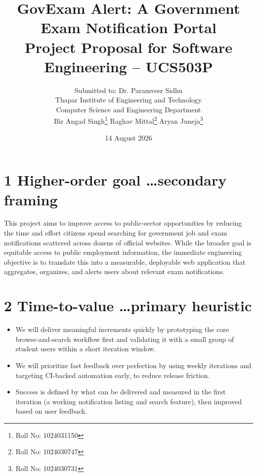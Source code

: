 \documentclass[11pt,a4paper]{article}
\title{\textbf{GovExam Alert: A Government Exam Notification Portal} \\[4pt]
\large Project Proposal for Software Engineering -- UCS503P}
\author{
Submitted to: Dr. Paramveer Sidhu \\
Thapar Institute of Engineering and Technology \\
Computer Science and Engineering Department \\[8pt]
Bir Angad Singh\thanks{Roll No: 1024031150} \quad
Raghav Mittal\thanks{Roll No: 1024030747} \quad
Aryan Juneja\thanks{Roll No: 1024030731}
}
\date{14 August 2026}
\begin{document}
\maketitle

\section*{1 Higher-order goal \dots secondary framing}
This project aims to improve access to public-sector opportunities by reducing the
time and effort citizens spend searching for government job and exam notifications
scattered across dozens of official websites. While the broader goal is equitable
access to public employment information, the immediate engineering objective is to
translate this into a measurable, deployable web application that aggregates,
organizes, and alerts users about relevant exam notifications.

\section*{2 Time-to-value \dots primary heuristic}
\begin{itemize}[leftmargin=1.5em]
  \item We will deliver meaningful increments quickly by prototyping the core
  browse-and-search workflow first and validating it with a small group of student
  users within a short iteration window.
  \item We will prioritize fast feedback over perfection by using weekly iterations
  and targeting CI-backed automation early, to reduce release friction.
  \item Success is defined by what can be delivered and measured in the first
  iteration (a working notification listing and search feature), then improved
  based on user feedback.
\end{itemize}
\end{document}
